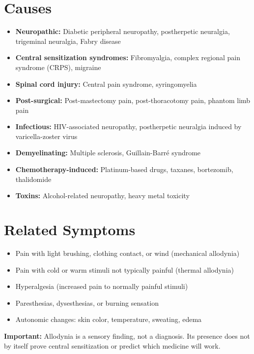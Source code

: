 \section*{Causes}
\begin{itemize}
 \item \textbf{Neuropathic:} Diabetic peripheral neuropathy, postherpetic neuralgia, trigeminal neuralgia, Fabry disease
 \item \textbf{Central sensitization syndromes:} Fibromyalgia, complex regional pain syndrome (CRPS), migraine
 \item \textbf{Spinal cord injury:} Central pain syndrome, syringomyelia
 \item \textbf{Post-surgical:} Post-mastectomy pain, post-thoracotomy pain, phantom limb pain
 \item \textbf{Infectious:} HIV-associated neuropathy, postherpetic neuralgia induced by varicella-zoster virus
 \item \textbf{Demyelinating:} Multiple sclerosis, Guillain-Barr\'{e} syndrome
 \item \textbf{Chemotherapy-induced:} Platinum-based drugs, taxanes, bortezomib, thalidomide
 \item \textbf{Toxins:} Alcohol-related neuropathy, heavy metal toxicity
\end{itemize}

\section*{Related Symptoms}
\begin{itemize}
 \item Pain with light brushing, clothing contact, or wind (mechanical allodynia)
 \item Pain with cold or warm stimuli not typically painful (thermal allodynia)
 \item Hyperalgesia (increased pain to normally painful stimuli)
 \item Paresthesias, dysesthesias, or burning sensation
 \item Autonomic changes: skin color, temperature, sweating, edema
\end{itemize}
\textbf{Important:} Allodynia is a sensory finding, not a diagnosis. Its presence does not by itself prove central sensitization or predict which medicine will work.

